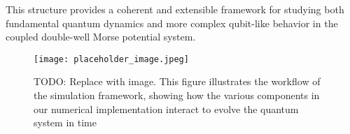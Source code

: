 \documentclass{subfiles}
\begin{document}
This structure provides a coherent and extensible framework for studying both fundamental quantum dynamics and more complex qubit-like behavior in the coupled double-well Morse potential system.

\begin{figure}[h!]
    \centering
    \texttt{[image: placeholder\_image.jpeg]}
    \caption{TODO: Replace with image. This figure illustrates the workflow of the simulation framework, showing how the various components in our numerical implementation interact to evolve the quantum system in time}
\end{figure}
\end{document}
